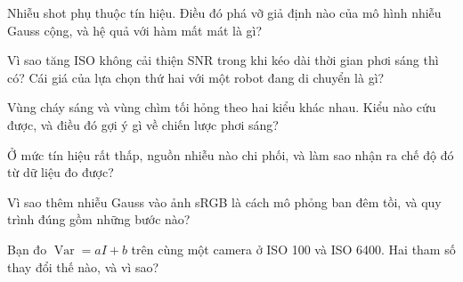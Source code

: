 \documentclass[../../../deep_learning.tex]{subfiles}
\begin{document}
\begin{tukiem}
\item Nhiễu shot phụ thuộc tín hiệu. Điều đó phá vỡ giả định nào của mô hình nhiễu Gauss cộng, và hệ quả với hàm mất mát là gì?
\item Vì sao tăng ISO không cải thiện SNR trong khi kéo dài thời gian phơi sáng thì có? Cái giá của lựa chọn thứ hai với một robot đang di chuyển là gì?
\item Vùng cháy sáng và vùng chìm tối hỏng theo hai kiểu khác nhau. Kiểu nào cứu được, và điều đó gợi ý gì về chiến lược phơi sáng?
\item Ở mức tín hiệu rất thấp, nguồn nhiễu nào chi phối, và làm sao nhận ra chế độ đó từ dữ liệu đo được?
\item Vì sao thêm nhiễu Gauss vào ảnh sRGB là cách mô phỏng ban đêm tồi, và quy trình đúng gồm những bước nào?
\item Bạn đo \(\operatorname{Var} = aI + b\) trên cùng một camera ở ISO 100 và ISO 6400. Hai tham số thay đổi thế nào, và vì sao?
\end{tukiem}
\ifSubfilesClassLoaded{\printbibliography[title={Nguồn}]}{}
\end{document}
